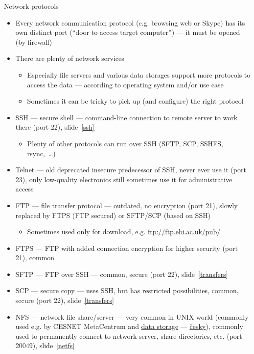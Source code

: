 \documentclass[compress, xelatex, 11pt, xcolor=svgnames, aspectratio=169, url={hyphens, lowtilde}]{beamer}
\begin{document}
\begin{frame}[allowframebreaks]{Network protocols}
	\begin{itemize}
		\item Every network communication protocol (e.g. browsing web or Skype) has its own distinct port (\enquote{door to access target computer}) --- it must be opened (by firewall)
		\item There are plenty of network services
		\begin{itemize}
			\item Especially file servers and various data storages support more protocols to access the data --- according to operating system and/or use case
			\item Sometimes it can be tricky to pick up (and configure) the right protocol
		\end{itemize}
		\item SSH --- secure shell --- command-line connection to remote server to work there (port 22), slide~\ref{ssh}
		\begin{itemize}
			\item Plenty of other protocols can run over SSH (SFTP, SCP, SSHFS, rsync,~\ldots)
		\end{itemize}
		\item Telnet --- old deprecated insecure predecessor of SSH, never ever use it (port 23), only low-quality electronics still sometimes use it for administrative access
		\item FTP --- file transfer protocol --- outdated, no encryption (port 21), slowly replaced by FTPS (FTP secured) or SFTP/SCP (based on SSH)
		\begin{itemize}
			\item Sometimes used only for download, e.g. \url{ftp://ftp.ebi.ac.uk/pub/}
		\end{itemize}
		\item FTPS --- FTP with added connection encryption for higher security (port 21), common
		\item SFTP --- FTP over SSH --- common, secure (port 22), slide~\ref{transfers}
		\item SCP --- secure copy --- uses SSH, but has restricted possibilities, common, secure (port 22), slide~\ref{transfers}
		\item NFS --- network file share/server --- very common in UNIX world (commonly used e.g. by CESNET MetaCentrum and \href{https://du.cesnet.cz/en/navody/nfs/start}{data storage} --- \href{https://du.cesnet.cz/cs/navody/nfs/start}{česky}), commonly used to permanently connect to network server, share directories, etc. (port 20049), slide~\ref{netfs}

\end{itemize}
\end{frame}
\end{document}
